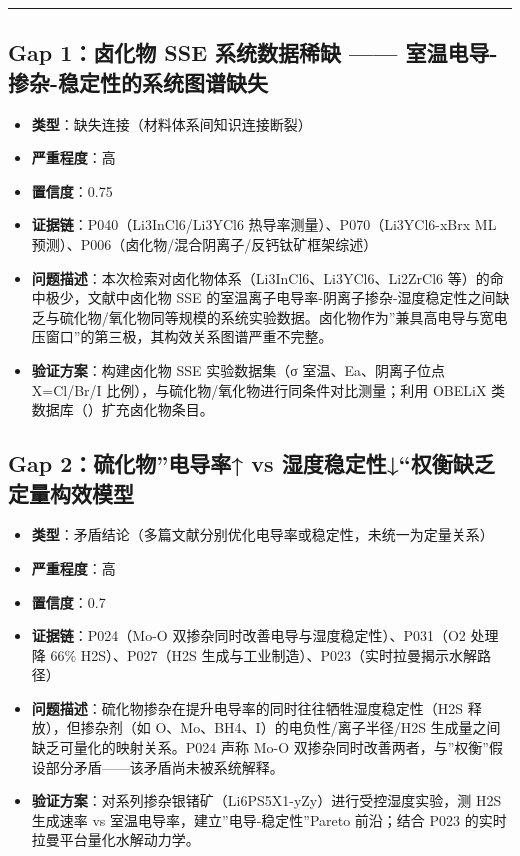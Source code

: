 \documentclass[12pt,a4paper]{ctexart}
\providecommand{\tightlist}{%
  \setlength{\itemsep}{0pt}\setlength{\parskip}{0pt}}
\begin{document}
\begin{center}\rule{0.5\linewidth}{0.5pt}\end{center}

\subsection{Gap 1：卤化物 SSE 系统数据稀缺 ------ 室温电导-掺杂-稳定性的系统图谱缺失}\label{gap:gap-1ux5364ux5316ux7269-sse-ux7cfbux7edfux6570ux636eux7a00ux7f3a-ux5ba4ux6e29ux7535ux5bfc-ux63baux6742-ux7a33ux5b9aux6027ux7684ux7cfbux7edfux56feux8c31ux7f3aux5931}

\begin{itemize}
\tightlist
\item
  \textbf{类型}：缺失连接（材料体系间知识连接断裂）
\item
  \textbf{严重程度}：高
\item
  \textbf{置信度}：0.75
\item
  \textbf{证据链}：P040（Li3InCl6/Li3YCl6 热导率测量）、P070（Li3YCl6-xBrx ML 预测）、P006（卤化物/混合阴离子/反钙钛矿框架综述）
\item
  \textbf{问题描述}：本次检索对卤化物体系（Li3InCl6、Li3YCl6、Li2ZrCl6 等）的命中极少，文献中卤化物 SSE 的室温离子电导率-阴离子掺杂-湿度稳定性之间缺乏与硫化物/氧化物同等规模的系统实验数据。卤化物作为''兼具高电导与宽电压窗口''的第三极，其构效关系图谱严重不完整。
\item
  \textbf{验证方案}：构建卤化物 SSE 实验数据集（σ 室温、Ea、阴离子位点 X=Cl/Br/I 比例），与硫化物/氧化物进行同条件对比测量；利用 OBELiX 类数据库（\cite{P080}）扩充卤化物条目。
\end{itemize}

\subsection{Gap 2：硫化物''电导率↑ vs 湿度稳定性↓``权衡缺乏定量构效模型}\label{gap:gap-2ux786bux5316ux7269ux7535ux5bfcux7387-vs-ux6e7fux5ea6ux7a33ux5b9aux6027ux6743ux8861ux7f3aux4e4fux5b9aux91cfux6784ux6548ux6a21ux578b}

\begin{itemize}
\tightlist
\item
  \textbf{类型}：矛盾结论（多篇文献分别优化电导率或稳定性，未统一为定量关系）
\item
  \textbf{严重程度}：高
\item
  \textbf{置信度}：0.7
\item
  \textbf{证据链}：P024（Mo-O 双掺杂同时改善电导与湿度稳定性）、P031（O2 处理降 66\% H2S）、P027（H2S 生成与工业制造）、P023（实时拉曼揭示水解路径）
\item
  \textbf{问题描述}：硫化物掺杂在提升电导率的同时往往牺牲湿度稳定性（H2S 释放），但掺杂剂（如 O、Mo、BH4、I）的电负性/离子半径/H2S 生成量之间缺乏可量化的映射关系。P024 声称 Mo-O 双掺杂同时改善两者，与''权衡''假设部分矛盾------该矛盾尚未被系统解释。
\item
  \textbf{验证方案}：对系列掺杂银锗矿（Li6PS5X1-yZy）进行受控湿度实验，测 H2S 生成速率 vs 室温电导率，建立''电导-稳定性''Pareto 前沿；结合 P023 的实时拉曼平台量化水解动力学。
\end{itemize}
\end{document}
